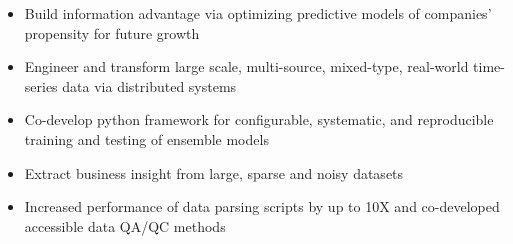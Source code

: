 \documentclass[10.95pt,letterpaper]{altacv}
\newlength{\comlogowidth}
\newcommand{\companylogo}[1]{%
	\savebox{\comlogobox}{\texttt{[image: \#1]}}%
	\settowidth{\comlogowidth}{\usebox{\comlogobox}}
}
\newcommand{\makelogospace}{\hspace*{\comlogowidth}\enspace}
\newcommand{\usecompanylogo}{\raisebox{0pt}[1em]{\usebox{\comlogobox}}\enspace}
\begin{document}
	\personalinfo{%
		\mailaddress{slli@alum.mit.edu}
	    \phone{(510) 396-9236}
		\location{Silicon Valley, CA}
		\linkedin{/cicilishuaili}
		\github{/cicilishuaili} ]
	}
	
	\begin{fullwidth}
		\makecvheader
	\end{fullwidth}
	
	
	\begin{itemize}
		\item Build information advantage via optimizing predictive models of companies' propensity for future growth
		\item Engineer and transform large scale, multi-source, mixed-type, real-world time-series data via distributed systems
		\item Co-develop python framework for configurable, systematic, and reproducible training and testing of ensemble models
		\item Extract business insight from large, sparse and noisy datasets
	\end{itemize}
	\divider	
	
\begin{itemize}
	\item Increased performance of data parsing scripts by up to 10X and co-developed accessible data QA/QC methods
\end{itemize}
\divider	
	
\end{document}
